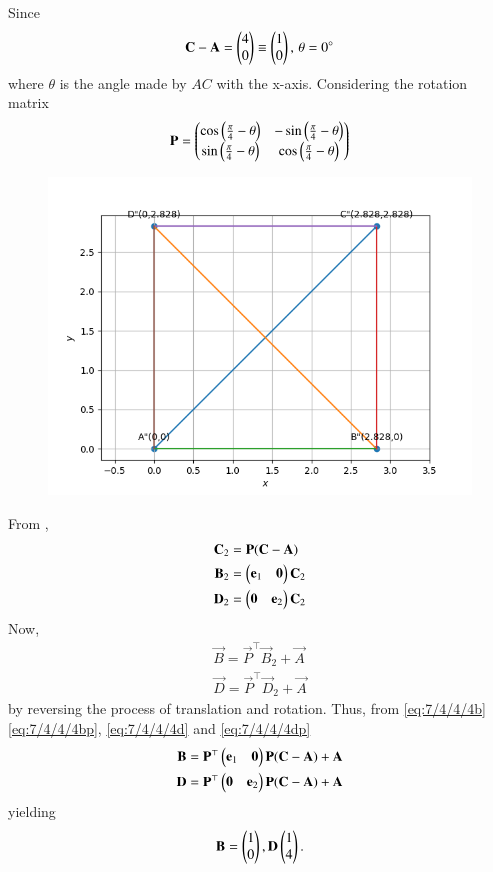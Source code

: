Since
\begin{align}
\mathbf{C} - \mathbf{A} = \begin{pmatrix}
4\\
0
\end{pmatrix} \equiv 
\begin{pmatrix}
1\\
0
\end{pmatrix},\,
\theta= 0\degree
\end{align}
		where
$\theta$ is the angle made by $AC$ with the x-axis.
Considering the rotation matrix 
\begin{align}
\mathbf{P} =
\begin{pmatrix}
\cos\left(\frac{\pi}{4}-\theta\right) & -\sin\left(\frac{\pi}{4}-\theta\right) \\
\sin\left(\frac{\pi}{4}-\theta\right) & \cos\left(\frac{\pi}{4}-\theta\right) 
\end{pmatrix}
\end{align}
\begin{figure}[!h]
	\begin{center} 
	    \includegraphics[width=\columnwidth]{chapters/10/7/4/4/figs/square2}
	\end{center}
\caption{}
\label{fig:7/4/4/4Fig3}
\end{figure}
From 
,
\begin{align}
	\mathbf{C}_2 &= \mathbf{P} (\mathbf{C}-\mathbf{A}) 
	\\
\label{eq:7/4/4/4bp}
	\mathbf{B}_2 &= \begin{pmatrix}\mathbf{e}_1 & \mathbf{0}\end{pmatrix}\mathbf{C}_2
	\\
\label{eq:7/4/4/4dp}
	\mathbf{D}_2 &= \begin{pmatrix} \mathbf{0} & \mathbf{e}_2\end{pmatrix}\mathbf{C}_2
\end{align}
Now, 
\begin{align}
\label{eq:7/4/4/4b}
	\vec{B} = \vec{P}^{\top}\vec{B}_2+\vec{A}
	\\
\label{eq:7/4/4/4d}
	\vec{D} = \vec{P}^{\top}\vec{D}_2+\vec{A}
\end{align}
by reversing the process of translation and rotation.  Thus, 
from
\eqref{eq:7/4/4/4b}
\eqref{eq:7/4/4/4bp},
\eqref{eq:7/4/4/4d}
and
\eqref{eq:7/4/4/4dp}
\begin{align}
	\mathbf{B} = \mathbf{P}^{\top}\begin{pmatrix}\mathbf{e}_1 & \mathbf{0}\end{pmatrix}\mathbf{P} (\mathbf{C}-\mathbf{A}) +\mathbf{A}
	\\
	\mathbf{D} = \mathbf{P}^{\top}\begin{pmatrix}\mathbf{0} & \mathbf{e}_2  \end{pmatrix}\mathbf{P} (\mathbf{C}-\mathbf{A}) +\mathbf{A}
\end{align}
yielding
		\begin{align}
\mathbf{B}=
\begin{pmatrix}
1\\
0
\end{pmatrix},
\mathbf{D}
\begin{pmatrix}
1\\
4
\end{pmatrix}.
		\end{align}
